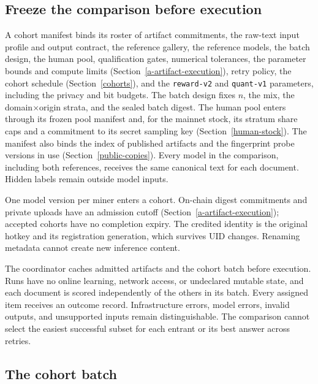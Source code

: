 \subsection{Freeze the comparison before execution}

A cohort manifest binds its roster of artifact commitments, the raw-text input
profile and output contract, the reference gallery, the reference models, the
batch design, the human pool, qualification gates, numerical tolerances, the
parameter bounds and compute limits (Section~\ref{a-artifact-execution}), retry
policy, the cohort schedule (Section~\ref{cohorts}), and the \texttt{reward-v2}
and \texttt{quant-v1} parameters, including the privacy and bit budgets. The
batch design fixes \(n\), the mix, the domain\(\times\)origin
strata, and the sealed batch digest. The human pool enters through its frozen
pool manifest and, for the mainnet stock, its stratum share caps and a
commitment to its secret sampling key (Section~\ref{human-stock}). The manifest also binds the index of
published artifacts and the fingerprint probe versions in use
(Section~\ref{public-copies}). Every model in the comparison, including both
references, receives the same canonical text for each document. Hidden labels
remain outside model inputs.

One model version per miner enters a cohort. On-chain digest commitments and
private uploads have an admission cutoff (Section~\ref{a-artifact-execution});
accepted cohorts have no completion expiry. The credited identity is the
original hotkey and its registration generation, which survives UID changes.
Renaming metadata cannot create new inference content.

The coordinator caches admitted artifacts and the cohort batch before
execution. Runs have no online learning, network access, or undeclared mutable
state, and each document is scored independently of the others in its batch.
Every assigned item receives an outcome record. Infrastructure errors, model
errors, invalid outputs, and unsupported inputs remain distinguishable. The
comparison cannot select the easiest successful subset for each entrant or its
best answer across retries.

\subsection{The cohort batch}\label{cohort-batch}

